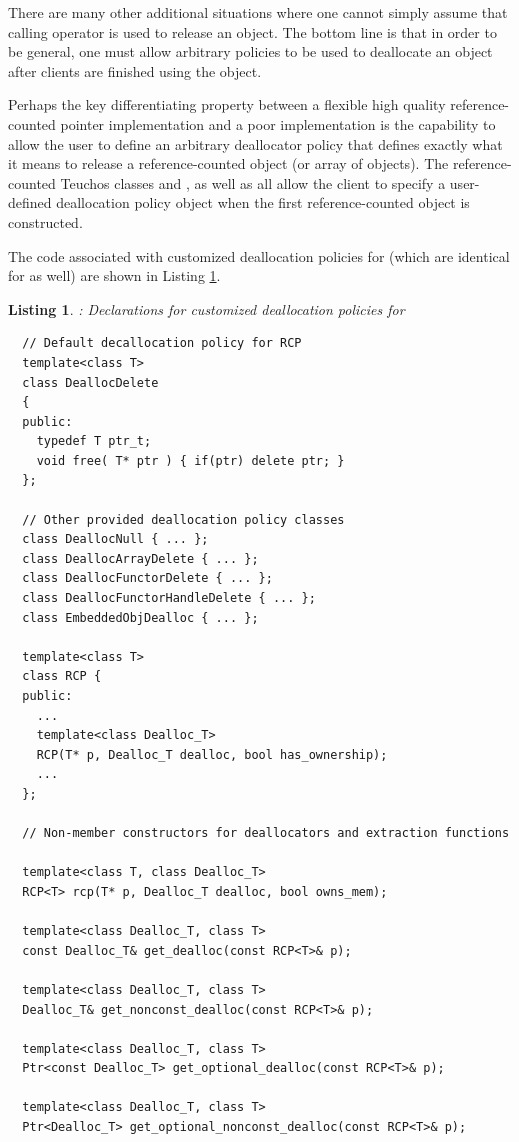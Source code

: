 \documentclass[pdf,ps2pdf,11pt]{SANDreport}
\newtheorem{listing}{Listing}
\begin{document}
There are many other additional situations where one cannot simply
assume that calling operator {} is used to release an
object.  The bottom line is that in order to be general, one must
allow arbitrary policies to be used to deallocate an object after
clients are finished using the object.

Perhaps the key differentiating property between a flexible high
quality reference-counted pointer implementation and a poor
implementation is the capability to allow the user to define an
arbitrary deallocator policy that defines exactly what it means to
release a reference-counted object (or array of objects).  The
reference-counted Teuchos classes {} and
{}, as well as {} all
allow the client to specify a user-defined deallocation policy object
when the first reference-counted object is constructed.

The code associated with customized deallocation policies for
{} (which are identical for {} as well) are
shown in Listing {}\ref{listing:RCP-dealloc}.

\begin{listing}: Declarations for customized deallocation policies
for {} \\
\label{listing:RCP-dealloc}
{\small\begin{verbatim}
  // Default decallocation policy for RCP
  template<class T>
  class DeallocDelete
  {
  public:
    typedef T ptr_t;
    void free( T* ptr ) { if(ptr) delete ptr; }
  };

  // Other provided deallocation policy classes
  class DeallocNull { ... };
  class DeallocArrayDelete { ... };
  class DeallocFunctorDelete { ... };
  class DeallocFunctorHandleDelete { ... };
  class EmbeddedObjDealloc { ... };

  template<class T>
  class RCP {
  public:
    ...
    template<class Dealloc_T>
    RCP(T* p, Dealloc_T dealloc, bool has_ownership);
    ...
  };

  // Non-member constructors for deallocators and extraction functions
  
  template<class T, class Dealloc_T>
  RCP<T> rcp(T* p, Dealloc_T dealloc, bool owns_mem);
  
  template<class Dealloc_T, class T>
  const Dealloc_T& get_dealloc(const RCP<T>& p);
  
  template<class Dealloc_T, class T>
  Dealloc_T& get_nonconst_dealloc(const RCP<T>& p);
  
  template<class Dealloc_T, class T>
  Ptr<const Dealloc_T> get_optional_dealloc(const RCP<T>& p);
  
  template<class Dealloc_T, class T> 
  Ptr<Dealloc_T> get_optional_nonconst_dealloc(const RCP<T>& p);

\end{verbatim}}
\end{listing}
\end{document}
